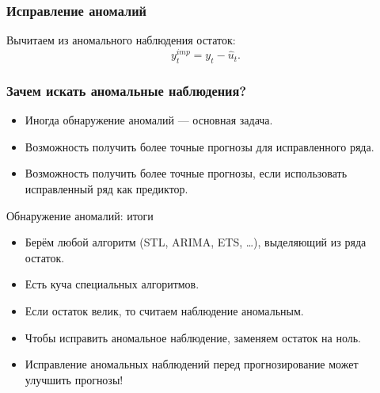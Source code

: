 \begin{frame}
  \frametitle{Исправление аномалий}

  \pause
  Вычитаем из аномального наблюдения остаток:
  \[
  y_t^{imp} = y_t  - \hat u_t.  
  \]

\end{frame}



\begin{frame}
  \frametitle{Зачем искать аномальные наблюдения?}

  \begin{itemize}[<+->]
    \item Иногда обнаружение аномалий — \alert{основная задача}. 
    \item Возможность получить \alert{более точные} прогнозы для исправленного ряда.
    \item Возможность получить \alert{более точные} прогнозы, если использовать исправленный ряд как предиктор.
  \end{itemize}
  

\end{frame}



\begin{frame}{Обнаружение аномалий: итоги}

  \begin{itemize}[<+->]
    \item Берём любой алгоритм (STL, ARIMA, ETS, \ldots), выделяющий из ряда \alert{остаток}.
    \item Есть \alert{куча} специальных алгоритмов.
    \item Если остаток \alert{велик}, то считаем наблюдение аномальным. 
    \item Чтобы исправить аномальное наблюдение, заменяем остаток \alert{на ноль}.
    \item \alert{Исправление} аномальных наблюдений перед прогнозирование может улучшить прогнозы!
  \end{itemize}
\end{frame}

